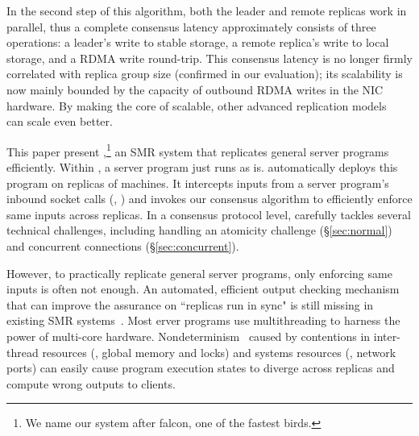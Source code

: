 In the second step of this algorithm, both the leader and remote replicas work 
in parallel, thus a complete consensus latency approximately consists of 
three operations: a leader's write to stable storage, a remote replica's write 
to local storage, and a RDMA write round-trip. This consensus 
latency is no longer firmly correlated with replica group size (confirmed in 
our evaluation); its scalability is now mainly bounded by the capacity of 
outbound RDMA writes in the NIC hardware. By making the core of \paxos 
scalable, other advanced replication 
models~\cite{epaxos:sosp13,mencius:osdi08,scatter:sosp11,manos:hotdep10} can 
scale even better.

This paper present \xxx,\footnote{We name our system after falcon, one of the 
fastest birds.} an SMR system that replicates general server programs 
efficiently. Within \xxx, a server program just runs as is. \xxx 
automatically deploys this program on replicas of machines. It intercepts 
inputs from a server program's inbound socket calls (\eg, \recv) and invokes 
our \paxos consensus algorithm to efficiently enforce same inputs across 
replicas. In a consensus protocol level, \xxx carefully tackles several 
technical challenges, including handling an atomicity challenge 
(\S\ref{sec:normal}) and concurrent connections (\S\ref{sec:concurrent}).


However, to practically replicate general server programs, only enforcing same 
inputs is often not enough. An automated, efficient output checking mechanism 
that can improve the assurance on ``replicas run in sync" is still missing in 
existing SMR 
systems~\cite{calvin:sigmod12,rex:eurosys14,crane:sosp15,dare:hpdc15}. 
Most erver programs use multithreading to harness the power of multi-core 
hardware. Nondeterminism~\cite{racepro:sosp11,dmp:asplos09,coredet:asplos10,
cui:tern:osdi10, kendo:asplos09,
dthreads:sosp11,peregrine:sosp11,parrot:sosp13,determinator:osdi10} caused by 
contentions in inter-thread resources (\eg, global memory and locks) and systems 
resources (\eg, network ports) can easily cause program execution states to 
diverge across replicas and compute wrong outputs to clients.

